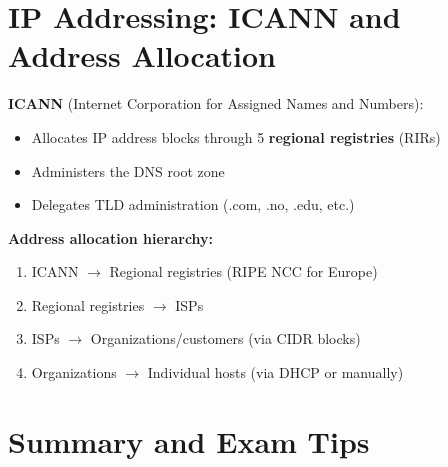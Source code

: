 \section{IP Addressing: ICANN and Address Allocation}

\begin{keybox}
\textbf{ICANN} (Internet Corporation for Assigned Names and Numbers):
\begin{itemize}[noitemsep]
    \item Allocates IP address blocks through 5 \textbf{regional registries} (RIRs)
    \item Administers the DNS root zone
    \item Delegates TLD administration (.com, .no, .edu, etc.)
\end{itemize}

\textbf{Address allocation hierarchy:}
\begin{enumerate}[noitemsep]
    \item ICANN $\rightarrow$ Regional registries (RIPE NCC for Europe)
    \item Regional registries $\rightarrow$ ISPs
    \item ISPs $\rightarrow$ Organizations/customers (via CIDR blocks)
    \item Organizations $\rightarrow$ Individual hosts (via DHCP or manually)
\end{enumerate}
\end{keybox}

\section{Summary and Exam Tips}

